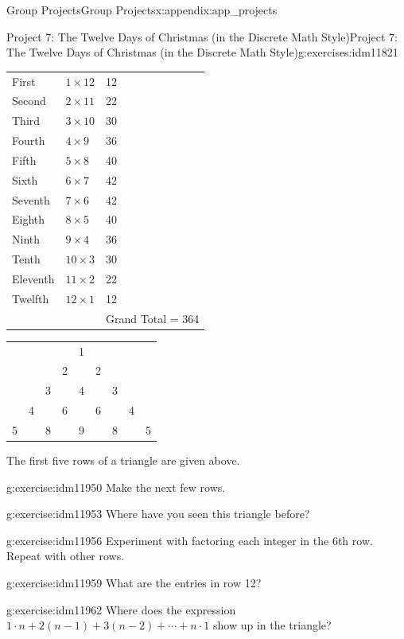 \documentclass[oneside,10pt,]{book}
\numberwithin{equation}{chapter}
\begin{document}
\begin{appendixptx}{Group Projects}{}{Group Projects}{}{}{x:appendix:app_projects}
\begin{exercises-section-numberless}{Project 7: The Twelve Days of Christmas (in the Discrete Math Style)}{}{Project 7: The Twelve Days of Christmas (in the Discrete Math Style)}{}{}{g:exercises:idm11821}
\begin{introduction}{}
\begin{sidebyside}{1}{0.2}{0.2}{0}
\begin{sbspanel}{0.6}
{\begin{tabular}{lll}
First&\(1 \times 12\)&12\tabularnewline[0pt]
Second&\(2 \times 11\)&22\tabularnewline[0pt]
Third&\(3 \times 10\)&30\tabularnewline[0pt]
Fourth&\(4 \times 9\)&36\tabularnewline[0pt]
Fifth&\(5 \times 8\)&40\tabularnewline[0pt]
Sixth&\(6 \times 7\)&42\tabularnewline[0pt]
Seventh&\(7 \times 6\)&42\tabularnewline[0pt]
Eighth&\(8 \times 5\)&40\tabularnewline[0pt]
Ninth&\(9 \times 4\)&36\tabularnewline[0pt]
Tenth&\(10 \times 3\)&30\tabularnewline[0pt]
Eleventh&\(11 \times 2\)&22\tabularnewline[0pt]
Twelfth&\(12 \times 1\)&12\tabularnewline[0pt]
&&Grand Total = 364
\end{tabular}
\par}
\end{sbspanel}%
\end{sidebyside}%
\begin{sidebyside}{1}{0.1}{0.1}{0}%
\begin{sbspanel}{0.8}%
{\centering%
\begin{tabular}{lllllllll}
&&&&1&&&&\tabularnewline[0pt]
&&&2&&2&&&\tabularnewline[0pt]
&&3&&4&&3&&\tabularnewline[0pt]
&4&&6&&6&&4&\tabularnewline[0pt]
5&&8&&9&&8&&5
\end{tabular}
\par}
\end{sbspanel}%
\end{sidebyside}%
\par
The first five rows of a triangle are given above.%
\end{introduction}%
\begin{divisionexercise}{1}{}{}{g:exercise:idm11950}%
Make the next few rows.%
\end{divisionexercise}%
\begin{divisionexercise}{2}{}{}{g:exercise:idm11953}%
Where have you seen this triangle before?%
\end{divisionexercise}%
\begin{divisionexercise}{3}{}{}{g:exercise:idm11956}%
Experiment with factoring each integer in the 6th row. Repeat with other rows.%
\end{divisionexercise}%
\begin{divisionexercise}{4}{}{}{g:exercise:idm11959}%
What are the entries in row 12?%
\end{divisionexercise}%
\begin{divisionexercise}{5}{}{}{g:exercise:idm11962}%
Where does the expression \(1 \cdot n + 2\left( n - 1 \right) + 3\left( n - 2 \right) + \cdots + n \cdot 1\) show up in the triangle?%
\end{divisionexercise}%

\end{exercises-section-numberless}
\end{appendixptx}
\end{document}
